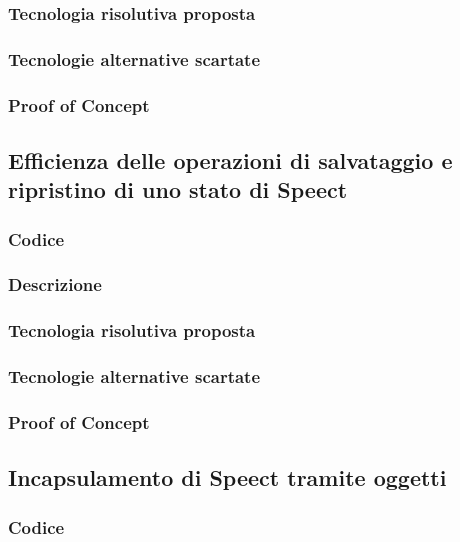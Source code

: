 \documentclass[./../Technology Baseline.tex]{subfiles}
\begin{document}
\subsubsection{Tecnologia risolutiva proposta}

\subsubsection{Tecnologie alternative scartate}

\subsubsection{Proof of Concept}

\subsection{Efficienza delle operazioni di salvataggio e ripristino di uno stato di Speect}

\subsubsection{Codice}

\subsubsection{Descrizione}

\subsubsection{Tecnologia risolutiva proposta}

\subsubsection{Tecnologie alternative scartate}

\subsubsection{Proof of Concept}

\subsection{Incapsulamento di Speect tramite oggetti}

\subsubsection{Codice}
\end{document}
